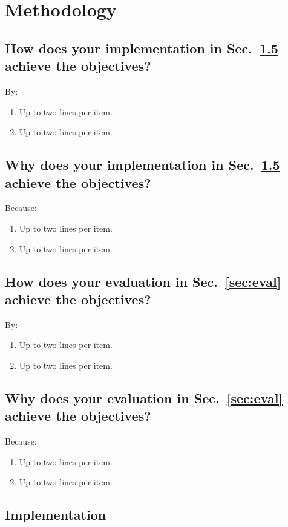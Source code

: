 \section{Methodology}

\subsection{How does your implementation in Sec.~\ref{sec:implem} achieve the objectives?}
By:
\begin{enumerate}
	\item Up to two lines per item.
	\item Up to two lines per item.
\end{enumerate}

\subsection{Why does your implementation in Sec.~\ref{sec:implem} achieve the objectives?}
Because:
\begin{enumerate}
	\item Up to two lines per item.
	\item Up to two lines per item.
\end{enumerate}

\subsection{How does your evaluation in Sec.~\ref{sec:eval} achieve the objectives?}
By:
\begin{enumerate}
	\item Up to two lines per item.
	\item Up to two lines per item.
\end{enumerate}

\subsection{Why does your evaluation in Sec.~\ref{sec:eval}  achieve the objectives?}
Because:
\begin{enumerate}
	\item Up to two lines per item.
	\item Up to two lines per item.
\end{enumerate}



\subsection{Implementation}
\label{sec:implem}

